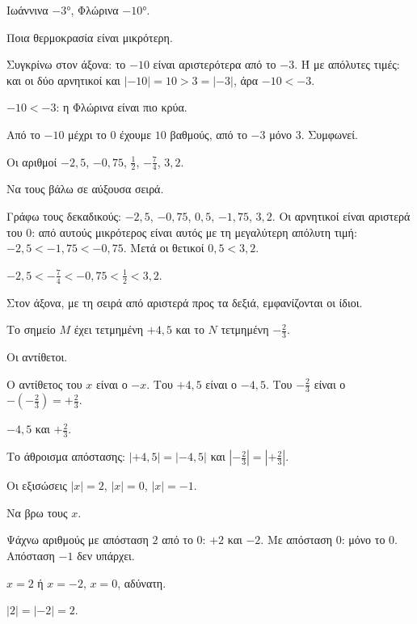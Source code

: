 
\tixero Ιωάννινα $-3$°, Φλώρινα $-10$°.\par
\tithelo Ποια θερμοκρασία είναι μικρότερη.\par
\possindeo Συγκρίνω στον άξονα: το $-10$ είναι αριστερότερα από το $-3$. Ή με απόλυτες τιμές: και οι δύο αρνητικοί και $|-10|=10>3=|-3|$, άρα $-10<-3$.\par
\apantisi $-10<-3$: η Φλώρινα είναι πιο κρύα.\par
\elegxos Από το $-10$ μέχρι το $0$ έχουμε $10$ βαθμούς, από το $-3$ μόνο $3$. Συμφωνεί.

\tixero Οι αριθμοί $-2{,}5$, $-0{,}75$, $\frac{1}{2}$, $-\frac{7}{4}$, $3{,}2$.\par
\tithelo Να τους βάλω σε αύξουσα σειρά.\par
\possindeo Γράφω τους δεκαδικούς: $-2{,}5$, $-0{,}75$, $0{,}5$, $-1{,}75$, $3{,}2$. Οι αρνητικοί είναι αριστερά του $0$: από αυτούς μικρότερος είναι αυτός με τη μεγαλύτερη απόλυτη τιμή: $-2{,}5<-1{,}75<-0{,}75$. Μετά οι θετικοί $0{,}5<3{,}2$.\par
\apantisi $-2{,}5<-\frac{7}{4}<-0{,}75<\frac{1}{2}<3{,}2$.\par
\elegxos Στον άξονα, με τη σειρά από αριστερά προς τα δεξιά, εμφανίζονται οι ίδιοι.

\begin{center}
\end{center}

\tixero Το σημείο $M$ έχει τετμημένη $+4{,}5$ και το $N$ τετμημένη $-\frac{2}{3}$.\par
\tithelo Οι αντίθετοι.\par
\possindeo Ο αντίθετος του $x$ είναι ο $-x$. Του $+4{,}5$ είναι ο $-4{,}5$. Του $-\frac{2}{3}$ είναι ο $-\left(-\frac{2}{3}\right)=+\frac{2}{3}$.\par
\apantisi $-4{,}5$ και $+\frac{2}{3}$.\par
\elegxos Το άθροισμα απόστασης: $|{+4{,}5}|=|{-4{,}5}|$ και $|-\frac{2}{3}|=|+\frac{2}{3}|$.

\tixero Οι εξισώσεις $|x|=2$, $|x|=0$, $|x|=-1$.\par
\tithelo Να βρω τους $x$.\par
\possindeo Ψάχνω αριθμούς με απόσταση $2$ από το $0$: $+2$ και $-2$. Με απόσταση $0$: μόνο το $0$. Απόσταση $-1$ δεν υπάρχει.\par
\apantisi $x=2$ ή $x=-2$, $x=0$, αδύνατη.\par
\elegxos $|2|=|-2|=2$.

